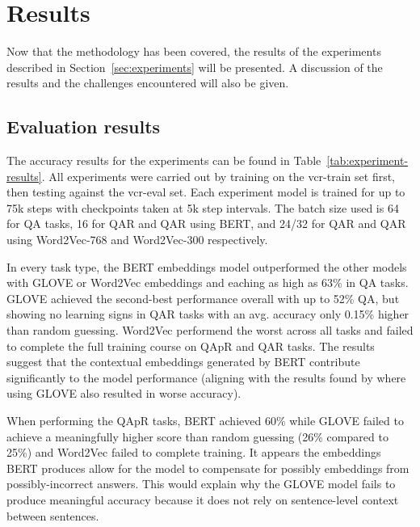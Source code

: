 \chapter{Results}
\label{chp:results}

Now that the methodology has been covered, the results of the experiments described in Section~\ref{sec:experiments} will be presented.
A discussion of the results and the challenges encountered will also be given.

\section{Evaluation results}
\label{sec:evaluation-results}

The accuracy results for the experiments can be found in Table~\ref{tab:experiment-results}.
All experiments were carried out by training on the vcr-train set first, then testing against the vcr-eval set.
Each experiment model is trained for up to 75k steps with checkpoints taken at 5k step intervals.
The batch size used is 64 for Q\rightarrow{}A tasks, 16 for QA\rightarrow{}R and Q\rightarrow{}AR using BERT, and 24/32 for QA\rightarrow{}R and Q\rightarrow{}AR using Word2Vec-768 and Word2Vec-300 respectively.


In every task type, the BERT embeddings model outperformed the other models with GLOVE or Word2Vec embeddings and eaching as high as 63\% in Q\rightarrow{}A tasks.
GLOVE achieved the second-best performance overall with up to 52\% Q\rightarrow{}A, but showing no learning signs in Q\rightarrow{}AR tasks with an avg. accuracy only 0.15\% higher than random guessing.
Word2Vec performend the worst across all tasks and failed to complete the full training course on QAp\rightarrow{}R and Q\rightarrow{}AR tasks.
The results suggest that the contextual embeddings generated by BERT contribute significantly to the model performance (aligning with the results found by \citeauthor{zellers_recognition_2019} where using GLOVE also resulted in worse accuracy\cite{zellers_recognition_2019}).

When performing the QAp\rightarrow{}R tasks, BERT achieved 60\% while GLOVE failed to achieve a meaningfully higher score than random guessing (26\% compared to 25\%) and Word2Vec failed to complete training.
It appears the embeddings BERT produces allow for the model to compensate for possibly embeddings from possibly-incorrect answers.
This would explain why the GLOVE model fails to produce meaningful accuracy because it does not rely on sentence-level context between sentences.


